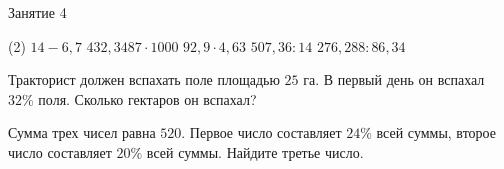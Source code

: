 \begin{class}[number=4]
	\begin{listofex}
		\item Занятие 4
	\end{listofex}
\end{class}

\begin{homework}[number=2]
	\begin{listofex}
		\item \begin{tasks}(2)
			\task \( 14-6,7 \)
			\task \( 432,3487\cdot 1000 \)
			\task \( 92,9\cdot4,63 \)
			\task \( 507,36:14 \)
			\task \( 276,288:86,34 \)
		\end{tasks}
		\item  Тракторист должен вспахать поле площадью \( 25 \) га. В первый день он вспахал \( 32\% \) поля. Сколько гектаров он вспахал?
		\item Сумма трех чисел равна \( 520 \). Первое число составляет \( 24\% \) всей суммы, второе число составляет \( 20\% \) всей суммы. Найдите третье число.
	\end{listofex}
\end{homework}

